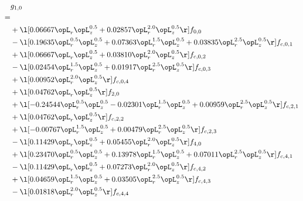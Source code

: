 \begin{alignat}{2} 
\label{eq:g_10_0} 
& g_{1,0} \nonumber \\ 
 = \\ 
& + \l[  0.06667 \opL_r \opL_z^{0.5} +  0.02857 \opL_r^{2.0} \opL_z^{0.5}  \r] f_{0,0} \nonumber \\ 
& - \l[  0.19635 \opL_r^{0.5} \opL_z^{0.5} +  0.07363 \opL_r^{1.5} \opL_z^{0.5} +  0.03835 \opL_r^{2.5} \opL_z^{0.5}  \r] f_{c,0,1} \nonumber \\ 
& + \l[  0.06667 \opL_r \opL_z^{0.5} +  0.03810 \opL_r^{2.0} \opL_z^{0.5}  \r] f_{c,0,2} \nonumber \\ 
& - \l[  0.02454 \opL_r^{1.5} \opL_z^{0.5} +  0.01917 \opL_r^{2.5} \opL_z^{0.5}  \r] f_{c,0,3} \nonumber \\ 
& + \l[  0.00952 \opL_r^{2.0} \opL_z^{0.5}  \r] f_{c,0,4} \nonumber \\ 
& + \l[  0.04762 \opL_r \opL_z^{0.5}  \r] f_{2,0} \nonumber \\ 
& + \l[  -0.24544 \opL_r^{0.5} \opL_z^{0.5}   -0.02301 \opL_r^{1.5} \opL_z^{0.5} +  0.00959 \opL_r^{2.5} \opL_z^{0.5}  \r] f_{c,2,1} \nonumber \\ 
& + \l[  0.04762 \opL_r \opL_z^{0.5}  \r] f_{c,2,2} \nonumber \\ 
& + \l[  -0.00767 \opL_r^{1.5} \opL_z^{0.5} +  0.00479 \opL_r^{2.5} \opL_z^{0.5}  \r] f_{c,2,3} \nonumber \\ 
& - \l[  0.11429 \opL_r \opL_z^{0.5} +  0.05455 \opL_r^{2.0} \opL_z^{0.5}  \r] f_{4,0} \nonumber \\ 
& + \l[  0.23470 \opL_r^{0.5} \opL_z^{0.5} +  0.13978 \opL_r^{1.5} \opL_z^{0.5} +  0.07011 \opL_r^{2.5} \opL_z^{0.5}  \r] f_{c,4,1} \nonumber \\ 
& - \l[  0.11429 \opL_r \opL_z^{0.5} +  0.07273 \opL_r^{2.0} \opL_z^{0.5}  \r] f_{c,4,2} \nonumber \\ 
& + \l[  0.04659 \opL_r^{1.5} \opL_z^{0.5} +  0.03505 \opL_r^{2.5} \opL_z^{0.5}  \r] f_{c,4,3} \nonumber \\ 
& - \l[  0.01818 \opL_r^{2.0} \opL_z^{0.5}  \r] f_{c,4,4} \nonumber \\ 
\end{alignat} 



